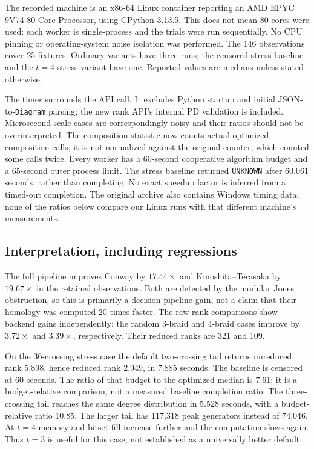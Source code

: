 \documentclass[11pt]{article}
\theoremstyle{remark}\newtheorem{remark}[theorem]{Remark}
\begin{document}
The recorded machine is an x86-64 Linux container reporting an
AMD EPYC 9V74 80-Core Processor, using CPython 3.13.5. This does not mean
80 cores were used: each worker is single-process and the trials were
run sequentially. No CPU pinning or operating-system noise isolation was
performed. The 146 observations cover 25 fixtures. Ordinary variants have
three runs; the censored stress baseline and the $t=4$ stress variant
have one. Reported values are medians unless stated otherwise.

The timer surrounds the API call. It excludes Python startup and initial
JSON-to-\texttt{Diagram} parsing; the new rank API's internal PD validation
is included. Microsecond-scale cases are correspondingly noisy and their
ratios should not be overinterpreted. The composition statistic now counts actual optimized composition calls; it is
not normalized against the original counter, which counted some calls twice.
Every worker has a 60-second
cooperative algorithm budget and a 65-second outer process limit.
The stress baseline returned \texttt{UNKNOWN} after 60.061 seconds, rather
than completing. No exact speedup factor is inferred from a timed-out
completion. The original archive also contains Windows timing data;
none of the ratios below compare our Linux runs with that different
machine's measurements.



\subsection{Interpretation, including regressions}
The full pipeline improves Conway by $17.44\times$ and Kinoshita--Terasaka
by $19.67\times$ in the retained observations. Both are detected by the
modular Jones obstruction, so this is primarily a decision-pipeline gain,
not a claim that their homology was computed 20 times faster.
The raw rank comparisons show backend gains independently: the random
3-braid and 4-braid cases improve by $3.72\times$ and $3.39\times$,
respectively. Their reduced ranks are 321 and 109.

On the 36-crossing stress case the default two-crossing tail returns
unreduced rank 5,898, hence reduced rank 2,949, in 7.885 seconds.
The baseline is censored at 60 seconds. The ratio of that budget to the
optimized median is 7.61; it is a budget-relative comparison, not a
measured baseline completion ratio. The three-crossing tail reaches the
same degree distribution in 5.528 seconds, with a budget-relative ratio
10.85. The larger tail has 117,318 peak generators instead of 74,046.
At $t=4$ memory and bitset fill increase further and the computation slows
again. Thus $t=3$ is useful for this case, not established as a universally
better default.
\end{document}
